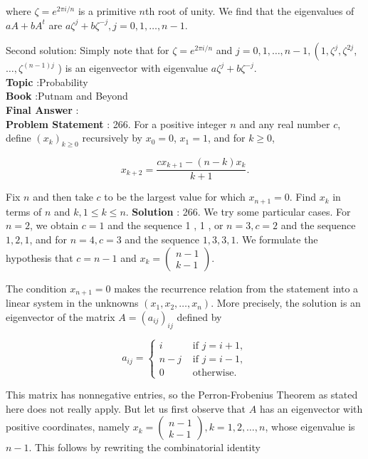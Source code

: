 \documentclass[10pt]{article}
\begin{document}
where $\zeta=e^{2 \pi i / n}$ is a primitive $n$th root of unity. We find that the eigenvalues of $a A+b A^{t}$ are $a \zeta^{j}+b \zeta^{-j}, j=0,1, \ldots, n-1$.

Second solution: Simply note that for $\zeta=e^{2 \pi i / n}$ and $j=0,1, \ldots, n-1,\left(1, \zeta^{j}, \zeta^{2 j}\right.$, $\ldots, \zeta^{(n-1) j}$ ) is an eigenvector with eigenvalue $a \zeta^{j}+b \zeta^{-j}$.
\\
\textbf{Topic} :Probability\\
\textbf{Book} :Putnam and Beyond\\
\textbf{Final Answer} :\\


\textbf{Problem Statement} :
266. For a positive integer $n$ and any real number $c$, define $\left(x_{k}\right)_{k \geq 0}$ recursively by $x_{0}=0$, $x_{1}=1$, and for $k \geq 0$,

$$
x_{k+2}=\frac{c x_{k+1}-(n-k) x_{k}}{k+1} .
$$

Fix $n$ and then take $c$ to be the largest value for which $x_{n+1}=0$. Find $x_{k}$ in terms of $n$ and $k, 1 \leq k \leq n$.
\textbf{Solution} :
266. We try some particular cases. For $n=2$, we obtain $c=1$ and the sequence 1 , 1 , or $n=3, c=2$ and the sequence $1,2,1$, and for $n=4, c=3$ and the sequence $1,3,3,1$. We formulate the hypothesis that $c=n-1$ and $x_{k}=\left(\begin{array}{c}n-1 \\ k-1\end{array}\right)$.

The condition $x_{n+1}=0$ makes the recurrence relation from the statement into a linear system in the unknowns $\left(x_{1}, x_{2}, \ldots, x_{n}\right)$. More precisely, the solution is an eigenvector of the matrix $A=\left(a_{i j}\right)_{i j}$ defined by

$$
a_{i j}= \begin{cases}i & \text { if } j=i+1, \\ n-j & \text { if } j=i-1, \\ 0 & \text { otherwise. }\end{cases}
$$

This matrix has nonnegative entries, so the Perron-Frobenius Theorem as stated here does not really apply. But let us first observe that $A$ has an eigenvector with positive coordinates, namely $x_{k}=\left(\begin{array}{c}n-1 \\ k-1\end{array}\right), k=1,2, \ldots, n$, whose eigenvalue is $n-1$. This follows by rewriting the combinatorial identity
\end{document}
